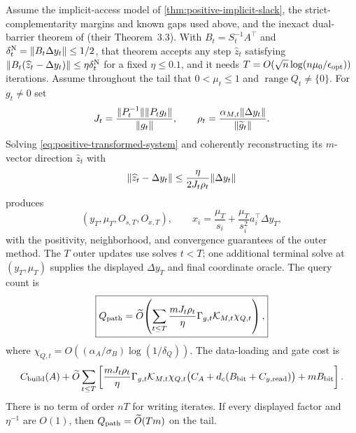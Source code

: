 \begin{theorem}
\label{thm:positive-compressed-qipm}
Assume the implicit-access model of \cref{thm:positive-implicit-slack}, the
strict-complementarity margins and known gaps used above, and the inexact
dual-barrier theorem of
\cite{zeguan2026-quantum-dual-logarithmic-barrier-method} (their
Theorem~3.3).  With $B_t=S_t^{-1}A^\top$ and
$\delta^{\rm N}_t=\lVert B_t\Delta y_t\rVert\le1/2$, that theorem accepts any step
$\widehat z_t$ satisfying
$\lVert B_t(\widehat z_t-\Delta y_t)\rVert\le\eta\delta^{\rm N}_t$ for a fixed
$\eta\le0.1$, and it needs
$T=O(\sqrt n\log(n\mu_0/\epsilon_{\rm opt}))$ iterations.  Assume throughout
the tail that $0<\mu_t\leq1$ and $\operatorname{range}Q_t\ne\{0\}$.  For
$g_t\ne0$ set
\begin{equation}
 J_t=\frac{\lVert P_t^{-1}\rVert\lVert P_tg_t\rVert}{\lVert g_t\rVert},\qquad
 \rho_t=\frac{\alpha_{M,t}\lVert\Delta y_t\rVert}{\lVert\widetilde g_t\rVert}.     \label{eq:positive-forcing-factor}
\end{equation}
Solving \eqref{eq:positive-transformed-system} and coherently reconstructing
its $m$-vector direction $\widehat z_t$ with
\[
 \lVert\widehat z_t-\Delta y_t\rVert
 \le\frac{\eta}{2J_t\rho_t}\lVert\Delta y_t\rVert
\]
produces
\[
 (y_T,\mu_T,O_{s,T},O_{x,T}),\qquad
 x_i=\frac{\mu_T}{s_i}+\frac{\mu_T}{s_i^2}a_i^\top\Delta y_T,
\]
with the positivity, neighborhood, and convergence guarantees of the outer
method.  The $T$ outer updates use solves $t<T$; one additional terminal solve
at $(y_T,\mu_T)$ supplies the displayed $\Delta y_T$ and final coordinate
oracle.  The query count is
\begin{equation}
 \boxed{Q_{\rm path}=\widetilde{O}\!\left(
 \sum_{t\leq T}\frac{mJ_t\rho_t}{\eta}
 \Gamma_{g,t}\mathcal K_{M,t}\chi_{Q,t}\right),}       \label{eq:positive-compressed-query}
\end{equation}
where $\chi_{Q,t}=O((\alpha_A/\sigma_B)\log(1/\delta_Q))$.  The data-loading
and gate cost is
\begin{equation}
 C_{\rm build}(A)+\widetilde{O}\sum_{t\leq T}\left[
 \frac{mJ_t\rho_t}{\eta}\Gamma_{g,t}\mathcal K_{M,t}\chi_{Q,t}
 \bigl(C_A+d_c(B_{\rm bit}+C_{y,{\rm read}})\bigr)
 +mB_{\rm bit}\right].                                  \label{eq:positive-compressed-gates}
\end{equation}
There is no term of order $nT$ for writing iterates.  If every displayed
factor and $\eta^{-1}$ are $O(1)$, then $Q_{\rm path}=\widetilde{O}(Tm)$ on the
tail.
\end{theorem}

